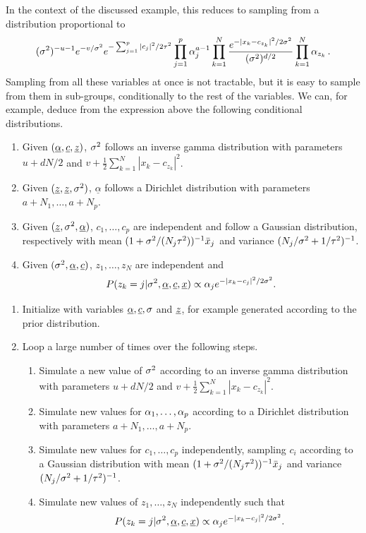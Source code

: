 In the context of the discussed example, this reduces to sampling from a distribution proportional to 
\begin{equation}
\label{eq:MoG.posterior}
(\sigma^2)^{-u-1} e^{-v/\sigma^2} e^{-\sum_{j=1}^p |c_j|^2/2\tau^2} \prod_{j=1}^p \alpha_j^{a-1}\prod_{k=1}^N \frac{e^{-|x_k - c_{z_k}|^2/2\sigma^2}}{(\sigma^2)^{d/2}} \prod_{k=1}^N \alpha_{z_k}\,.
\end{equation}
Sampling from all these variables at once is  not tractable, but it is easy to sample from them in sub-groups, conditionally to the rest of the variables. We can, for example, deduce from the expression above the following conditional distributions.
\begin{enumerate}[label=(\roman*), wide=0.5cm]
\item Given $(\underline\alpha, {\underline{c}}, {\underline{z}})$, $\sigma^2$ follows an inverse gamma distribution with parameters $u+dN/2$ and $v + \frac12 \sum_{k=1}^N|x_k-c_{z_k}|^2$. 
\item Given $({\underline{z}}, {\underline{z}}, \sigma^2)$, $\underline\alpha$ follows a Dirichlet distribution with parameters $a+N_1, \ldots, a+N_p$.
\item Given $({\underline{z}}, \sigma^2, \underline\alpha)$, $c_1, \ldots, c_p$ are independent and follow a Gaussian distribution, respectively with mean $(1 + \sigma^2/(N_j\tau^2))^{-1} \bar x_j$ and variance $(N_j/\sigma^2 + 1/\tau^2)^{-1}$.
\item Given $(\sigma^2, \underline\alpha, {\underline{c}})$, $z_1, \ldots, z_N$ are independent and 
\[
P(z_k=j|\sigma^2, {\underline{\alpha}}, {\underline{c}}, {\underline{x}}) \propto \alpha_j e^{-|x_k-c_j|^2/2\sigma^2}.
\]
\end{enumerate}



\begin{algorithm}
\label{alg:gs.MoG}
\begin{enumerate}[label=(\arabic*)]
\item Initialize with variables $\underline\alpha, {\underline{c}}, \sigma$ and ${\underline{z}}$, for example generated according to the prior distribution.
\item Loop a large number of times over the following steps.
\begin{enumerate}[label=(\roman*),wide=1cm]
\item Simulate  a new value of $\sigma^2$ according to an inverse gamma distribution with parameters $u+dN/2$ and $v + \frac12 \sum_{k=1}^N|x_k-c_{z_k}|^2$. 
\item Simulate new values for $\alpha_1, \ldots, \alpha_p$ according to a Dirichlet distribution with parameters $a+N_1, \ldots, a+N_p$.
\item Simulate new values for  $c_1, \ldots, c_p$ independently, sampling $c_i$ according to a Gaussian distribution with mean $(1 + \sigma^2/(N_j\tau^2))^{-1} \bar x_j$ and variance $(N_j/\sigma^2 + 1/\tau^2)^{-1}$.
\item Simulate new values of $z_1, \ldots, z_N$ independently such that
\[
P(z_k=j|\sigma^2,{\underline{\alpha}}, {\underline{c}}, {\underline{x}}) \propto \alpha_j e^{-|x_k-c_j|^2/2\sigma^2}.
\]
\end{enumerate}
\end{enumerate}
\end{algorithm}

